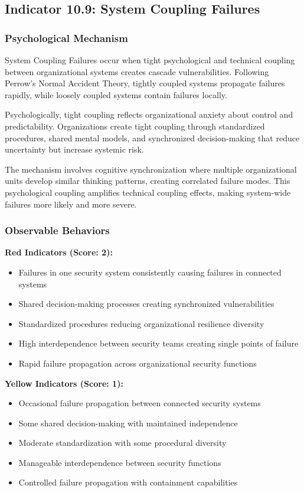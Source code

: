 \documentclass[11pt,a4paper]{article}
\begin{document}
\subsection{Indicator 10.9: System Coupling Failures}

\subsubsection{Psychological Mechanism}

System Coupling Failures occur when tight psychological and technical coupling between organizational systems creates cascade vulnerabilities. Following Perrow's\cite{perrow1984} Normal Accident Theory, tightly coupled systems propagate failures rapidly, while loosely coupled systems contain failures locally.

Psychologically, tight coupling reflects organizational anxiety about control and predictability. Organizations create tight coupling through standardized procedures, shared mental models, and synchronized decision-making that reduce uncertainty but increase systemic risk.

The mechanism involves cognitive synchronization where multiple organizational units develop similar thinking patterns, creating correlated failure modes. This psychological coupling amplifies technical coupling effects, making system-wide failures more likely and more severe.

\subsubsection{Observable Behaviors}

\textbf{Red Indicators (Score: 2):}
\begin{itemize}
\item Failures in one security system consistently causing failures in connected systems
\item Shared decision-making processes creating synchronized vulnerabilities
\item Standardized procedures reducing organizational resilience diversity
\item High interdependence between security teams creating single points of failure
\item Rapid failure propagation across organizational security functions
\end{itemize}

\textbf{Yellow Indicators (Score: 1):}
\begin{itemize}
\item Occasional failure propagation between connected security systems
\item Some shared decision-making with maintained independence
\item Moderate standardization with some procedural diversity
\item Manageable interdependence between security functions
\item Controlled failure propagation with containment capabilities
\end{itemize}
\end{document}
